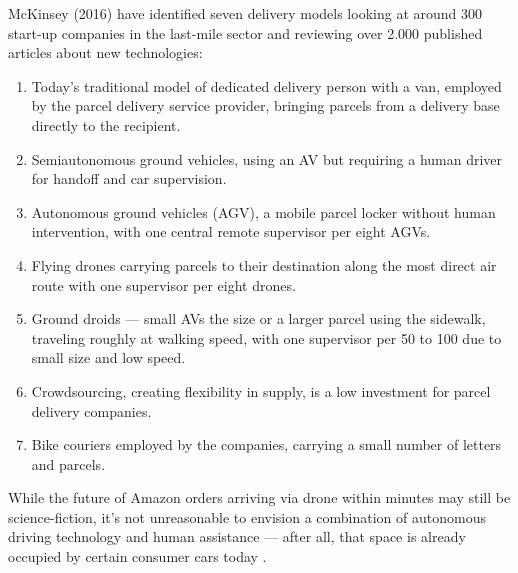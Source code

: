 \documentclass[12pt, usenames, dvipsnames]{report}
\begin{document}
\begin{flushleft}
McKinsey (2016) \cite{mckinsey2016} have identified seven delivery models looking at around 300 start-up companies in the last-mile sector and reviewing over 2.000 published articles about new technologies: 

\begin{enumerate}
	\item Today's traditional model of dedicated delivery person with a van, employed by the parcel delivery service provider, bringing parcels from a delivery base directly to the recipient.
	\item Semiautonomous ground vehicles, using an AV but requiring a human driver for handoff and car supervision.
	\item Autonomous ground vehicles (AGV), a mobile parcel locker without human intervention, with one central remote supervisor per eight AGVs.
	\item Flying drones carrying parcels to their destination along the most direct air route with one supervisor per eight drones.
	\item Ground droids --- small AVs the size or a larger parcel using the sidewalk, traveling roughly at walking speed, with one supervisor per 50 to 100 due to small size and low speed.
	\item Crowdsourcing, creating flexibility in supply, is a low investment for parcel delivery companies.
	\item Bike couriers employed by the companies, carrying a small number of letters and parcels.
\end{enumerate}

While the future of Amazon orders arriving via drone within minutes may still be science-fiction, it's not unreasonable to envision a combination of autonomous driving technology and human assistance --- after all, that space is already occupied by certain consumer cars today \cite{mcfarland2020}.


\end{flushleft}
\end{document}
